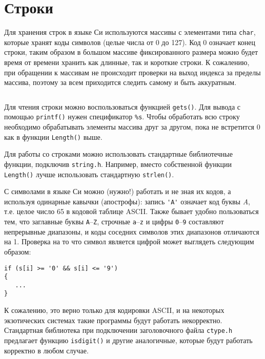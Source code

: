 \section{Строки}

Для хранения строк в языке Си используются массивы с элементами типа
\texttt{char}, которые хранят коды символов (целые числа от 0 до 127). Код 0
означает конец строки, таким образом в большом массиве фиксированного размера
можно будет время от времени хранить как длинные, так и короткие строки. К
сожалению, при обращении к массивам не происходит проверки на выход индекса за
пределы массива, поэтому за всем приходится следить самому и быть аккуратным.
%
\inputminted{c}{samples/string.c}

Для чтения строки можно воспользоваться функцией \texttt{gets()}. Для вывода
с помощью \texttt{printf()} нужен спецификатор \verb|%s|. Чтобы обработать
всю строку необходимо обрабатывать элементы массива друг за другом, пока не
встретится 0 как в функции \texttt{Length()} выше.

Для работы со строками можно использовать стандартные библиотечные функции,
подключив \texttt{string.h}. Например, вместо собственной функции
\texttt{Length()} лучше использовать стандартную \texttt{strlen()}.

С символами в языке Си можно (нужно!) работать и не зная их кодов, а используя
одинарные кавычки (апострофы): запись \verb|'A'| означает код буквы
\textit{A}, т.е. целое число 65 в кодовой таблице ASCII. Также бывает удобно
пользоваться тем, что заглавные буквы \texttt{A}--\texttt{Z}, строчные
\texttt{a}--\texttt{z} и цифры \texttt{0}--\texttt{9} составляют непрерывные
диапазоны, и коды соседних символов этих диапазонов отличаются на 1. Проверка
на то что символ является цифрой может выглядеть следующим образом:
%
\begin{verbatim}
if (s[i] >= '0' && s[i] <= '9')
{
   ...
}
\end{verbatim}

К сожалению, это верно только для кодировки ASCII, и на некоторых экзотических
системах такие программы будут работать некорректно. Стандартная библиотека
при подключении заголовочного файла \texttt{ctype.h} предлагает функцию
\texttt{isdigit()} и другие аналогичные, которые будут работать корректно в
любом случае.
